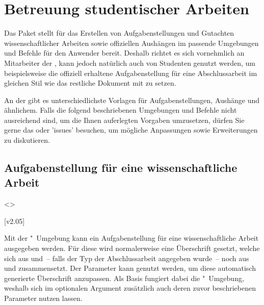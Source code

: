 \chapter[%
  Das Paket \Package{tudscrsupervisor} -- Studentische Betreuung%
]{%
  Betreuung studentischer Arbeiten%
}

\begin{DeclareEntity}{}
Das Paket  stellt für das Erstellen von 
Aufgabenstellungen und Gutachten wissenschaftlicher Arbeiten sowie offiziellen 
Aushängen im \CD passende Umgebungen und Befehle für den Anwender bereit. 
Deshalb richtet es sich vornehmlich an Mitarbeiter der \TnUD, kann jedoch 
natürlich auch von Studenten genutzt werden, um beispielsweise die offiziell 
erhaltene Aufgabenstellung für eine Abschlussarbeit im gleichen Stil wie das 
restliche Dokument mit  zu setzen.

An der \TUD gibt es unterschiedlichste Vorlagen für Aufgabenstellungen, 
Aushänge und ähnlichem. Falls die folgend beschriebenen Umgebungen und Befehle 
nicht ausreichend sind, um die Ihnen auferlegten Vorgaben umzusetzen, dürfen 
Sie gerne das \Forum oder \GitHubRepo'issues' besuchen, um mögliche 
Anpassungen sowie Erweiterungen zu diskutieren.



\section{%
  Aufgabenstellung für eine wissenschaftliche Arbeit%
}

\begin{Declaration}
  {}
  <>
\begin{Declaration}
  {}
\begin{Declaration}
  {}
  [v2.05]
\printdeclarationlist

Mit der "~Umgebung kann ein Aufgabenstellung für eine 
wissenschaftliche Arbeit ausgegeben werden. Für diese wird normalerweise eine 
Überschrift gesetzt, welche sich aus  und~-- falls der Typ der 
Abschlussarbeit angegeben wurde~-- noch aus  und  
zusammensetzt. Der Parameter  kann genutzt werden, 
um diese automatisch generierte Überschrift anzupassen. Als Basis fungiert 
dabei die "~Umgebung, weshalb sich im optionalen Argument 
zusätzlich auch deren zuvor beschriebenen Parameter nutzen lassen.


\end{Declaration}
\end{Declaration}
\end{Declaration}
\end{DeclareEntity}

